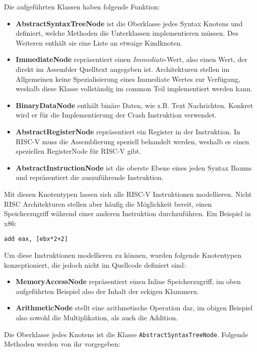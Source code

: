 \label{module-arch-ast-node-types}
Die aufgeführten Klassen haben folgende Funktion:
\begin{itemize}
	\item \textbf{AbstractSyntaxTreeNode} ist die Oberklasse jedes Syntax Knotens
	und definiert, welche Methoden die Unterklassen implementieren müssen. Des
	Weiteren enthält sie eine Liste an etwaige Kindknoten.
	\item \textbf{ImmediateNode} repräsentiert einen \textit{Immediate}-Wert,
	also einen Wert, der direkt im Assembler Quelltext angegeben ist. Architekturen
	stellen im Allgemeinen keine Spezialisierung eines Immediate Wertes zur
	Verfügung, weshalb diese Klasse vollständig im common Teil implementiert werden
	kann.
	\item \textbf{BinaryDataNode} enthält binäre Daten, wie z.B. Text Nachrichten.
	Konkret wird er für die Implementierung der Crash Instruktion verwendet.
	\item \textbf{AbstractRegisterNode} repräsentiert ein Register in der
	Instruktion. In RISC-V muss die Assemblierung speziell behandelt werden,
	weshalb es einen speziellen RegisterNode für RISC-V gibt.
	\item \textbf{AbstractInstructionNode} ist die oberste Ebene eines jeden Syntax
	Baums und repräsentiert die auszuführende Instruktion.
\end{itemize}
Mit diesen Knotentypen lassen sich alle RISC-V Instruktionen modellieren. Nicht
RISC Architekturen stellen aber häufig die Möglichkeit bereit, einen Speicherzugriff
während einer anderen Instruktion durchzuführen. Ein Beispiel in x86:
\begin{lstlisting}[language={[x86masm]Assembler}]
add eax, [ebx*2+2]
\end{lstlisting}
Um diese Instruktionen modellieren zu können, wurden folgende Knotentypen
konzeptioniert, die jedoch nicht im Quellcode definiert sind:
\begin{itemize}
	\item \textbf{MemoryAccessNode} repräsentiert einen Inline Speicherzugriff,
	im oben aufgeführten Beispiel also der Inhalt der eckigen Klammern.
	\item \textbf{ArithmeticNode} stellt eine arithmetische Operation dar, im
	obigen Beispiel also sowohl die Multiplikation, als auch die Addition.
\end{itemize}

Die Oberklasse jedes Knotens ist die Klasse \texttt{AbstractSyntaxTreeNode}.
Folgende Methoden werden von ihr vorgegeben:

